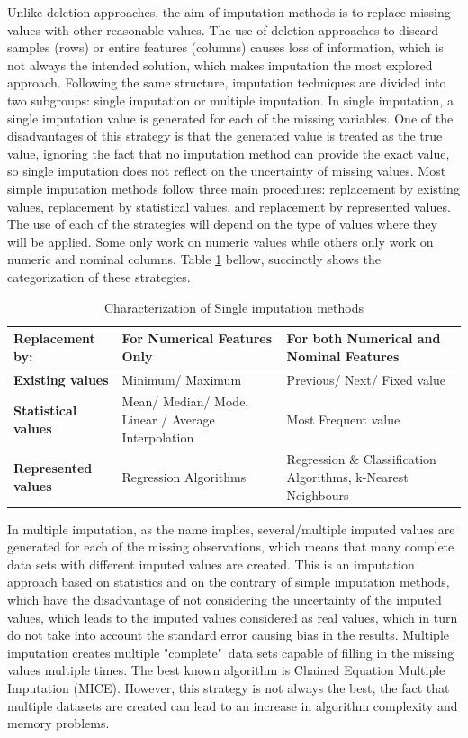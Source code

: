 Unlike deletion approaches, the aim of imputation methods is to replace missing values with other reasonable values. The use of deletion approaches to discard samples (rows) or entire features (columns) causes loss of information, which is not always the intended solution, which makes imputation the most explored approach. Following the same structure, imputation techniques are divided into two subgroups: single imputation or multiple imputation. In single imputation, a single imputation value is generated for each of the missing variables. One of the disadvantages of this strategy is that the generated value is treated as the true value, ignoring the fact that no imputation method can provide the exact value, so single imputation does not reflect on the uncertainty of missing values. Most simple imputation methods follow three main procedures: replacement by existing values, replacement by statistical values, and replacement by represented values. The use of each of the strategies will depend on the type of values where they will be applied. Some only work on numeric values while others only work on numeric and nominal columns. Table \ref{table:1} bellow, succinctly shows the categorization of these strategies.

\begin{table}[h!]
\centering
\begin{center}
\begin{tabular}{ | m{5.5em} | m{5cm}| m{5cm} | } 
 \hline
 \textbf{Replacement by:} & 	\textbf{For Numerical Features Only} & \textbf{For both Numerical and Nominal Features} \\ 
 \hline
 \textbf{Existing values} & Minimum/ Maximum & Previous/ Next/ Fixed value\\
 \hline
 \textbf{Statistical values} & Mean/ Median/ Mode, Linear / Average Interpolation & Most Frequent  value\\
 \hline
  \textbf{Represented values} & Regression Algorithms & Regression \& Classification Algorithms, k-Nearest Neighbours \\ 
 \hline
\end{tabular}
\caption{Characterization of Single imputation methods}
\label{table:1}
\end{center}
\end{table}

In multiple imputation, as the name implies, several/multiple imputed values are generated for each of the missing observations, which means that many complete data sets with different imputed values are created. This is an imputation approach based on statistics and on the contrary of simple imputation methods, which have the disadvantage of not considering the uncertainty of the imputed values, which leads to the imputed values considered as real values, which in turn do not take into account the standard error causing bias in the results\cite{Azur}. Multiple imputation creates multiple "complete"\ data sets capable of filling in the missing values multiple times. The best known algorithm is Chained Equation Multiple Imputation (MICE). However, this strategy is not always the best, the fact that multiple datasets are created can lead to an increase in algorithm complexity and memory problems.


